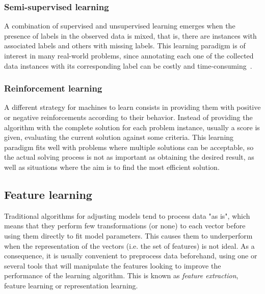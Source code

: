 \subsubsection{Semi-supervised learning}

A combination of supervised and unsupervised learning emerges when the presence of labels in the observed data is mixed, that is, there are instances with associated labels and others with missing labels. This learning paradigm is of interest in many real-world problems, since annotating each one of the collected data instances with its corresponding label can be costly and time-consuming~. 

\subsubsection{Reinforcement learning}

A different strategy for machines to learn consists in providing them with positive or negative reinforcements according to their behavior. Instead of providing the algorithm with the complete solution for each problem instance, usually a score is given, evaluating the current solution against some criteria. This learning paradigm fits well with problems where multiple solutions can be acceptable, so the actual solving process is not as important as obtaining the desired result, as well as situations where the aim is to find the most efficient solution.



\subsection{Feature learning}

Traditional algorithms for adjusting models tend to process data "as is", which means that they perform few transformations (or none) to each vector before using them directly to fit model parameters. This causes them to underperform when the representation of the vectors (i.e. the set of features) is not ideal. As a consequence, it is usually convenient to preprocess data beforehand, using one or several tools that will manipulate the features looking to improve the performance of the learning algorithm. This is known as \textit{feature extraction}, feature learning or representation learning. 

